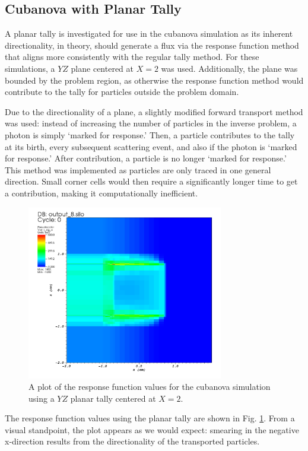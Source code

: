 \documentclass[]{article}
\begin{document}
	\subsection{Cubanova with Planar Tally} \label{Sec: plane_tally}		
		A planar tally is investigated for use in the cubanova simulation as its inherent directionality, in theory, should generate a flux via the response function method that aligns more consistently with the regular tally method. For these simulations, a $YZ$ plane centered at $X = 2$ was used. Additionally, the plane was bounded by the problem region, as otherwise the response function method would contribute to the tally for particles outside the problem domain. 
		
		Due to the directionality of a plane, a slightly modified forward transport method was used: instead of increasing the number of particles in the inverse problem, a photon is simply `marked for response.' Then, a particle contributes to the tally at its birth, every subsequent scattering event, and also if the photon is `marked for response.' After contribution, a particle is no longer `marked for response.' This method was implemented as particles are only traced in one general direction. Small corner cells would then require a significantly longer time to get a contribution, making it computationally inefficient.
		
		\begin{figure} [h!]
			\centering
			\includegraphics[height=3in]{Figures/plane_r_sig_a.png}
			\caption{A plot of the response function values for the cubanova simulation using a $YZ$ planar tally centered at $X=2$. }
			\label{fig:plane_r_sig_a}
		\end{figure}
		
		The response function values using the planar tally are shown in Fig. \ref{fig:plane_r_sig_a}. From a visual standpoint, the plot appears as we would expect: smearing in the negative x-direction results from the directionality of the transported particles.
		
\end{document}
